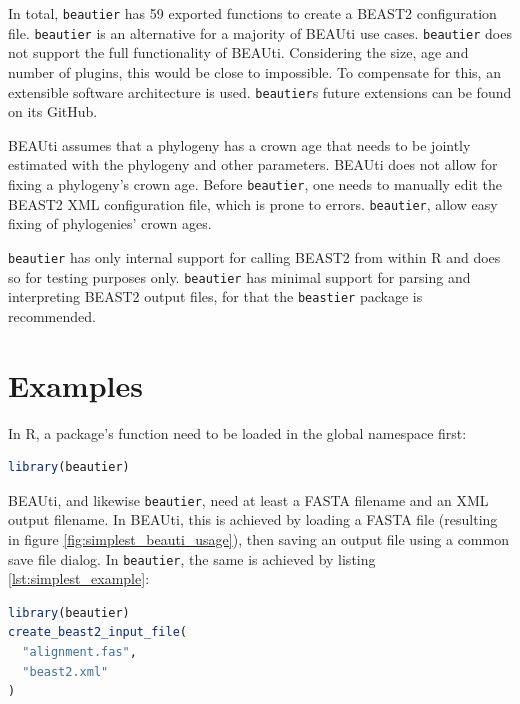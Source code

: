 \documentclass{article}
\begin{document}
In total, \verb;beautier; has 59 exported functions to create
a BEAST2 configuration file. \verb;beautier; is an alternative for a majority of BEAUti use cases.
\verb;beautier; does not support the full functionality of BEAUti. Considering
the size, age and number of plugins, this would be close to impossible.
To compensate for this, an extensible software architecture is used.
\verb;beautier;s future extensions can be found on its GitHub.

BEAUti assumes that a phylogeny has a crown age that needs to be jointly estimated
with the phylogeny and other parameters. BEAUti does not allow for fixing
a phylogeny's crown age. Before \verb;beautier;, one needs to manually edit the BEAST2 
XML configuration file, which is prone to errors. \verb;beautier;, allow easy
fixing of phylogenies' crown ages.

\verb;beautier; has only internal support for calling BEAST2 from within R and does
so for testing purposes only. \verb;beautier; has minimal support for parsing and interpreting BEAST2 output files,
for that the \verb;beastier; \cite{beastier} package is recommended.

\section{Examples}

In R, a package's function need to be loaded in the global namespace first:

\begin{lstlisting}[language=R, caption=Loading, label=lst:loading_beautier, floatplacement=H]
library(beautier)
\end{lstlisting}

BEAUti, and likewise \verb;beautier;, need at least a FASTA filename
and an XML output filename. In BEAUti, this is achieved by loading a FASTA file (resulting
in figure \ref{fig:simplest_beauti_usage}), then saving an output file using a common
save file dialog. In \verb;beautier;, the same is achieved by listing \ref{lst:simplest_example}:

\begin{lstlisting}[language=R, caption=Simplest example, label=lst:simplest_example, floatplacement=H]
library(beautier)
create_beast2_input_file(
  "alignment.fas",
  "beast2.xml"
)
\end{lstlisting}
\end{document}
